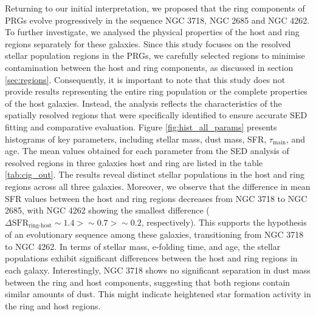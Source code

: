 \documentclass{pas}
\begin{document}
{Returning to our initial interpretation, we proposed that the ring components of PRGs evolve progressively in the sequence NGC 3718, NGC 2685 and NGC 4262. To further investigate, we analysed the physical properties of the host and ring regions separately for these galaxies. Since this study focuses on the resolved stellar population regions in the PRGs, we carefully selected regions to minimise contamination between the host and ring components, as discussed in section \ref{sec:regions}. Consequently, it is important to note that this study does not provide results representing the entire ring population or the complete properties of the host galaxies. Instead, the analysis reflects the characteristics of the spatially resolved regions that were specifically identified to ensure accurate SED fitting and comparative evaluation. Figure \ref{fig:hist_all_params} presents histograms of key parameters, including stellar mass, dust mass, SFR, \(\tau_{\text{main}}\), and age. The mean values obtained for each parameter from the SED analysis of resolved regions in three galaxies host and ring are listed in the table \ref{tab:cig_out}. The results reveal distinct stellar populations in the host and ring regions across all three galaxies. }
{Moreover, we observe that the difference in mean SFR values between the host and ring regions decreases from NGC 3718 to NGC 2685, with NGC 4262 showing the smallest difference ($\Delta \mathrm{SFR}_{\text{ring-host}} \sim1.4 > \sim0.7 > \sim0.2$, respectively). This supports the hypothesis of an evolutionary sequence among these galaxies, transitioning from NGC 3718 to NGC 4262. In terms of stellar mass, e-folding time, and age, the stellar populations exhibit significant differences between the host and ring regions in each galaxy. Interestingly, NGC 3718 shows no significant separation in dust mass between the ring and host components, suggesting that both regions contain similar amounts of dust. This might indicate heightened star formation activity in the ring and host regions.}
\end{document}
